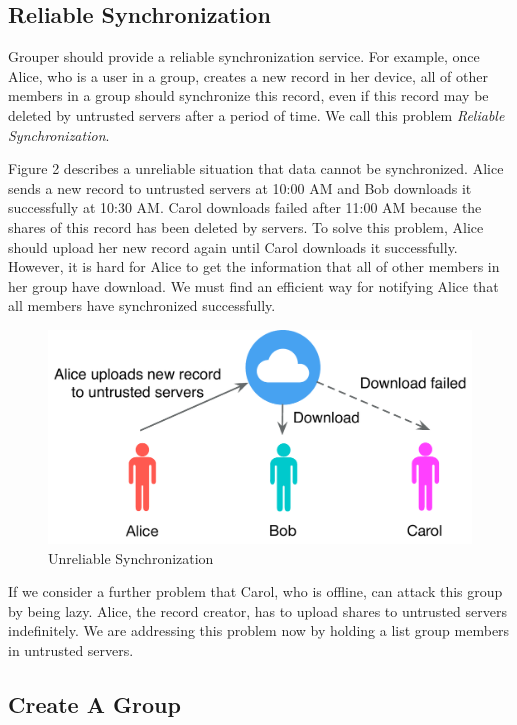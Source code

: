 \documentclass[twocolumn,10pt]{article}
\begin{document}
\subsection{Reliable Synchronization}
Grouper should provide a reliable synchronization service. For example, once Alice, who is a user in a group, creates a new record in her device, all of other members in a group should synchronize this record, even if this record may be deleted by untrusted servers after a period of time. We call this problem \emph{Reliable Synchronization}.

Figure 2 describes a unreliable situation that data cannot be synchronized. Alice sends a new record to untrusted servers at 10:00 AM and Bob downloads it successfully at 10:30 AM. Carol downloads failed after 11:00 AM because the shares of this record has been deleted by servers. To solve this problem, Alice should upload her new record again until Carol downloads it successfully. However, it is hard for Alice to get the information that all of other members in her group have download. We must find an efficient way for notifying Alice that all members have synchronized successfully.

\begin{figure}[t]
	\centering
	\includegraphics[scale=0.35]{unreliabe_sync}
	\caption{Unreliable Synchronization}
\end{figure}

If we consider a further problem that Carol, who is offline, can attack this group by being lazy. Alice, the record creator, has to upload shares to untrusted servers indefinitely. We are addressing this problem now by holding a list group members in untrusted servers.

\subsection{Create A Group}
\end{document}
